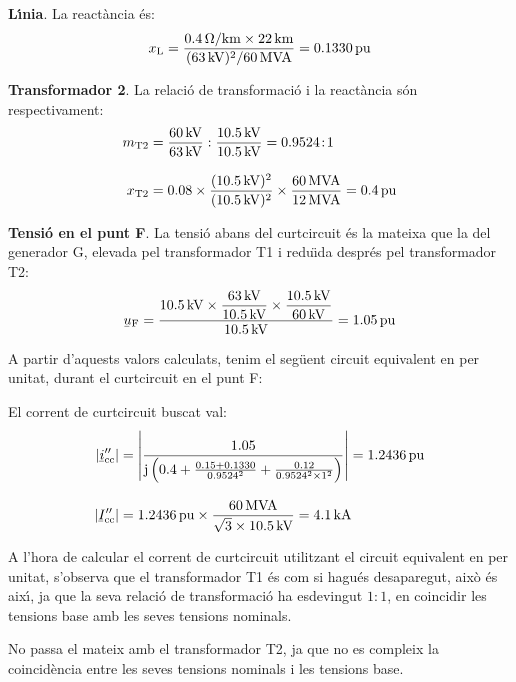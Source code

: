 \begin{exemple}
    \textbf{L\'{\i}nia}. La react\`{a}ncia \'{e}s:
    \[
    x_\mathrm{L} = \frac{\SI{0,4}{\ensuremath{\mathrm{\Omega}}/km} \times \SI{22}{km}} {(\SI{63}{kV})^2/\SI{60}{MVA}}  =
    \SI{0,1330}{pu}
    \]

    \textbf{Transformador 2}. La relaci\'{o} de transformaci\'{o} i la react\`{a}ncia s\'{o}n respectivament:
    \begin{align*}
    m_\mathrm{T2} &= \frac{\SI{60}{kV}}{\SI{63}{kV}} :
    \frac{\SI{10,5}{kV}}{\SI{10,5}{kV}} = \num{0,9524}\!:\!1 \\[3mm]
    x_\mathrm{T2} &= \num{0,08} \times \frac{(\SI{10,5}{kV})^2}{(\SI{10,5}{kV})^2} \times
    \frac{\SI{60}{MVA}}{\SI{12}{MVA}}  = \SI{0,4}{pu}
    \end{align*}

    \textbf{Tensi\'{o} en el punt F}. La tensi\'{o} abans del curtcircuit \'{e}s la mateixa que la del generador G, elevada pel transformador T1 i redu\"{\i}da despr\'{e}s pel transformador T2:
    \[
    \cmplx{u}\ped{F} = \frac{\SI{10,5}{kV} \times
    \dfrac{\SI{63}{kV}}{\SI{10,5}{kV}} \times
    \dfrac{\SI{10,5}{kV}}{\SI{60}{kV}}}{\SI{10,5}{kV}} = \SI{1,05}{pu}
    \]

    A partir d'aquests valors calculats, tenim el seg\"{u}ent circuit equivalent en per unitat, durant el
    curtcircuit en el punt F:

    \begin{center}
       
    \end{center}

    El corrent de curtcircuit buscat val:
    \begin{align*}
    |\cmplx{i}''\ped{cc}| &= \left| \frac{\num{1,05}}{\ju \left( \num{0,4} + \frac{\num{0,15} + \num{0,1330}}{\num{0,9524}^2} + \frac{\num{0,12}}{\num{0,9524}^2 \times 1^2} \right)} \right| =
     \SI{1,2436}{pu} \\[3mm]
     |\cmplx{I}''\ped{cc}| &= \SI{1,2436}{pu}\times\frac{\SI{60}{MVA}}{\sqrt{3}\times \SI{10,5}{kV}} =
     \SI{4,1}{kA}
    \end{align*}

     A l'hora de calcular el corrent de curtcircuit utilitzant el circuit equivalent en per unitat,
     s'observa que el transformador T1 \'{e}s com si hagu\'{e}s desaparegut,
     aix\`{o} \'{e}s aix\'{\i}, ja que la seva relaci\'{o} de transformaci\'{o} ha esdevingut
     $1\!:\!1$, en coincidir les tensions base amb les seves tensions nominals.

     No passa el mateix amb el transformador T2, ja que no es compleix
     la coincid\`{e}ncia entre les seves tensions nominals i les tensions
     base.


\end{exemple}
